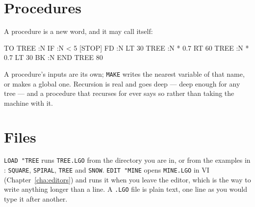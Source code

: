 \section{Procedures}
A procedure is a new word, and it may call itself:

\begin{type}
TO TREE :N
  IF :N < 5 [STOP]
  FD :N LT 30 TREE :N * 0.7
  RT 60 TREE :N * 0.7
  LT 30 BK :N
END
TREE 80
\end{type}

\noindent A procedure's inputs are its own; \verb|MAKE| writes the
nearest variable of that name, or makes a global one. Recursion is real
and goes deep --- deep enough for any tree --- and a procedure that
recurses for ever says so rather than taking the machine with it.

\section{Files}
\verb|LOAD "TREE| runs \texttt{TREE.LGO} from the directory you are in,
or from the examples in : \texttt{SQUARE},
\texttt{SPIRAL}, \texttt{TREE} and \texttt{SNOW}. \verb|EDIT "MINE|
opens \texttt{MINE.LGO} in VI (Chapter~\ref{cha:editors}) and runs it
when you leave the editor, which is the way to write anything longer
than a line. A \texttt{.LGO} file is plain text, one line as you would
type it after another.
